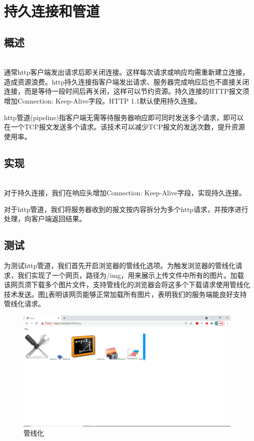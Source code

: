 \section{持久连接和管道}
\subsection{概述}
\ \\
通常http客户端发出请求后即关闭连接。这样每次请求或响应均需重新建立连接，造成资源浪费。http持久连接指客户端发出请求、服务器完成响应后也不直接关闭连接，而是等待一段时间后再关闭，这样可以节约资源。持久连接的HTTP报文须增加Connection: Keep-Alive字段。HTTP 1.1默认使用持久连接。

http管道(pipeline)指客户端无需等待服务器响应即可同时发送多个请求，即可以在一个TCP报文发送多个请求。该技术可以减少TCP报文的发送次数，提升资源使用率。
\subsection{实现}
\ \\
对于持久连接，我们在响应头增加Connection: Keep-Alive字段，实现持久连接。

对于http管道，我们将服务器收到的报文按内容拆分为多个http请求，并按序进行处理，向客户端返回结果。
\subsection{测试}
为测试http管道，我们首先开启浏览器的管线化选项。为触发浏览器的管线化请求，我们实现了一个网页，路径为/img，用来展示上传文件中所有的图片。加载该网页须下载多个图片文件，支持管线化的浏览器会将这多个下载请求使用管线化技术发送。图\ref{pipeline}表明该网页能够正常加载所有图片，表明我们的服务端能良好支持管线化请求。

\begin{figure}
\begin{center}
\includegraphics[width=\textwidth]{figs/pipeline.PNG}
\end{center}
\caption{管线化}
\label{pipeline}
\end{figure}